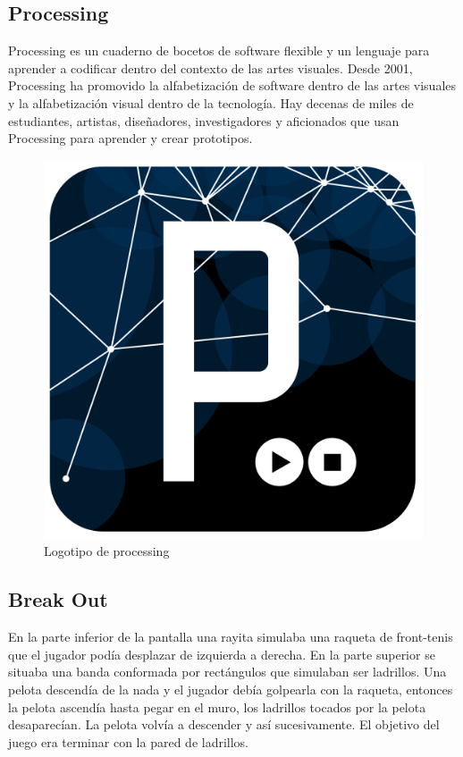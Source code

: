 \documentclass[10pt,a4paper]{article}
\begin{document}
\begin{multicols}{2}
\subsection{Processing}
Processing es un cuaderno de bocetos de software flexible y un lenguaje para aprender a codificar dentro del contexto de las artes visuales. Desde 2001, Processing ha promovido la alfabetización de software dentro de las artes visuales y la alfabetización visual dentro de la tecnología. Hay decenas de miles de estudiantes, artistas, diseñadores, investigadores y aficionados que usan Processing para aprender y crear prototipos.
\begin{figure}[H]
\centering
\includegraphics[scale=0.1]{proce.png}
\caption{Logotipo de processing}
\end{figure}




\subsection{Break Out}

En la parte inferior de la pantalla una rayita simulaba una raqueta de front-tenis que el jugador podía desplazar de izquierda a derecha. En la parte superior se situaba una banda conformada por rectángulos que simulaban ser ladrillos. Una pelota descendía de la nada y el jugador debía golpearla con la raqueta, entonces la pelota ascendía hasta pegar en el muro, los ladrillos tocados por la pelota desaparecían. La pelota volvía a descender y así sucesivamente. El objetivo del juego era terminar con la pared de ladrillos. 


\end{multicols}
\end{document}
